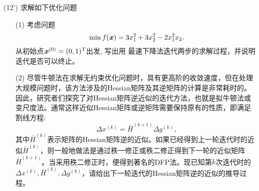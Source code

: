 \documentclass[12pt,a4paper,openany,twoside]{ctexbook}
\begin{document}
%	

\begin{exercise}(12')
	求解如下优化问题
	\begin{itemize}
		\item [(1)] 考虑问题
		$$
		\min f(\boldsymbol{\mathit{x}})=3 x_1^2+3 x_2^2-2x_1^2 x_2 .
		$$
		从初始点$\boldsymbol{\mathit{x}}^{(0)}=(0,1)^{\mathrm{T}}$出发, 写出用 最速下降法迭代两步的求解过程，并说明迭代是否可以终止。
		\item[(2)] 尽管牛顿法在求解无约束优化问题时，具有更高阶的收敛速度，但在处理大规模问题时，该方法涉及的Hessian矩阵及其逆矩阵的计算是非常耗时的。因此，研究者们探究了对Hessian矩阵逆近似的迭代方法，也就是拟牛顿法或变尺度法。通常这样近似Hessian矩阵或逆矩阵需要保持原有的性质，即满足割线方程:
		$$\Delta x^{(k)} = \bar{H}^{(k+1)} \Delta g^{(k)},$$
		其中$\bar{H}^{(k)}$表示矩阵的Hessian矩阵逆的近似。如果已经得到上一轮迭代时的近似$\bar{H}^{(k)}$，则一般地做法是通过秩一修正或秩二修正得到下一轮的近似矩阵$\bar{H}^{(k+1)}$。当采用秩二修正时，便得到著名的DFP法。现已知第$k$次迭代时的$\Delta x^{(k)}, \bar{H}^{(k)}, \Delta g^{(k)}$，请给出下一轮迭代的Hessian矩阵逆的近似的推导过程。
	\end{itemize}
\end{exercise}
\end{document}
